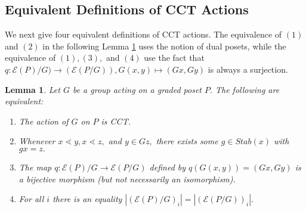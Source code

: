 \documentclass[10 pt]{amsart}
\theoremstyle{plain}
\newtheorem{lem}[thm]{Lemma}
\theoremstyle{definition}
\theoremstyle{remark}
\numberwithin{equation}{section}
\newcommand\ssec{\subsection}
\begin{document}
\ssec{Equivalent Definitions of CCT Actions}

We next give four equivalent definitions of CCT actions. The equivalence of $(1)$ and $(2)$ in the following Lemma \ref{lem:cover_transitive_equivalence} uses the notion of dual posets, while the equivalence of $(1),(3),$ and $(4)$ use the fact that $q:\mathcal E(P)/G) \rightarrow (\mathcal E(P/G)),G(x,y)\mapsto (Gx,Gy)$ is always a surjection.

\begin{lem}
\label{lem:cover_transitive_equivalence}
Let $G$ be a group acting on a graded poset $P.$ The following are equivalent:
\begin{enumerate}
  \item The action of $G$ on $P$ is CCT.
  \item Whenever $x \lessdot y,x \lessdot z,$ and $y \in Gz,$ there exists some $g \in Stab(x)$ with $gx = z.$
  \item The map $q\colon \mathcal E(P)/G\rightarrow \mathcal E(P/G)$ defined by $q(G(x, y)) = (Gx,Gy)$ is a bijective morphism (but not necessarily an isomorphism).
  \item For all $i$ there is an equality $|(\mathcal E(P)/G)_i|=| (\mathcal E(P/G))_i|.$
\end{enumerate}
\end{lem}
\end{document}
